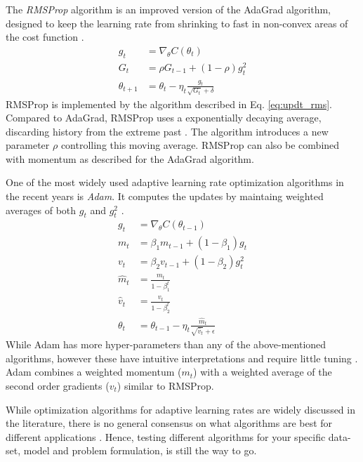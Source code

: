 The \textit{RMSProp} algorithm is an improved version of the AdaGrad algorithm, designed to keep the learning rate from shrinking to fast in non-convex areas of the cost function \citep[p. 122]{Ketkar2017}.
\begin{equation}\label{eq:updt_rms}
\begin{split}
    g_t &= \nabla_{\theta}C(\theta_t)   \\
    G_t &= \rho G_{t-1} + (1-\rho)g_t^2              \\
    \theta_{t+1} &= \theta_t - \eta_t \frac{g_t}{\sqrt{G_t} + \delta}
\end{split}
\end{equation}
RMSProp is implemented by the algorithm described in Eq. \ref{eq:updt_rms}.
Compared to AdaGrad, RMSProp uses a exponentially decaying average, discarding history from the extreme past \citep[p. 304]{Goodfellow-et-al-2016}.
The algorithm introduces a new parameter $\rho$ controlling this moving average.
RMSProp can also be combined with momentum as described for the AdaGrad algorithm.

One of the most widely used adaptive learning rate optimization algorithms in the recent years is \textit{Adam}.
It computes the updates by maintaing weighted averages of both $g_t$ and $g_t^2$ \citep[p. 123]{Ketkar2017}.
\begin{equation}\label{eq:updt_adam}
\begin{split}
    g_t &= \nabla_{\theta}C(\theta_{t-1})   \\
    m_t &= \beta_1m_{t-1} + (1-\beta_1)g_t \\
    v_t &= \beta_2v_{t-1} + (1-\beta_2)g_t^2 \\
    \hat{m}_t &= \frac{m_t}{1-\beta_1^t} \\
    \hat{v}_t &= \frac{v_t}{1-\beta_2^t} \\
    \theta_{t} &= \theta_{t-1} - \eta_t \frac{\hat{m}_t}{\sqrt{\hat{v}_t}+\epsilon}
\end{split}
\end{equation}
While Adam has more hyper-parameters than any of the above-mentioned algorithms, however these have intuitive interpretations and require little tuning \cite{kingba}.
Adam combines a weighted momentum ($m_t$) with a weighted average of the second order gradients ($v_t$) similar to RMSProp.

While optimization algorithms for adaptive learning rates are widely discussed in the literature, there is no general consensus on what algorithms are best for different applications \cite{schaul2014}.
Hence, testing different algorithms for your specific data-set, model and problem formulation, is still the way to go.

